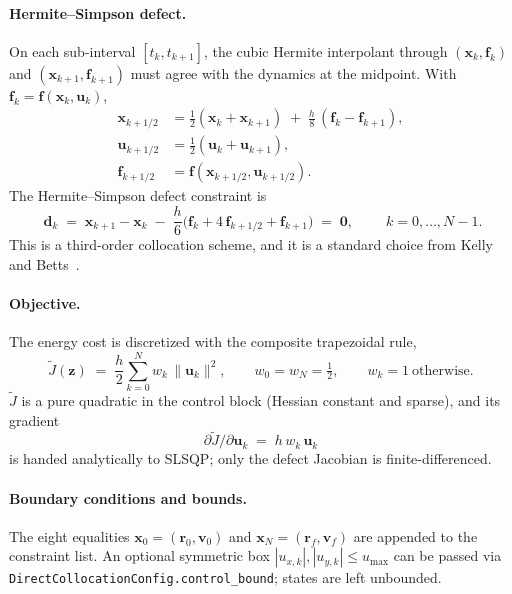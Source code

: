 \documentclass[8pt,a4paper]{article}
\newcommand{\bvec}[1]{\bm{#1}}
\newcommand{\xvec}{\bvec{x}}
\newcommand{\uvec}{\bvec{u}}
\newcommand{\fvec}{\bvec{f}}
\theoremstyle{definition}
\theoremstyle{remark}
\begin{document}
\paragraph{Hermite--Simpson defect.}
On each sub-interval $[t_k, t_{k+1}]$, the cubic Hermite interpolant
through $(\xvec_k, \fvec_k)$ and $(\xvec_{k+1}, \fvec_{k+1})$ must
agree with the dynamics at the midpoint. With
$\fvec_k = \fvec(\xvec_k, \uvec_k)$,
\begin{align}
  \xvec_{k+1/2} &= \tfrac12(\xvec_k + \xvec_{k+1})
     \;+\; \tfrac{h}{8}\,(\fvec_k - \fvec_{k+1}), \\
  \uvec_{k+1/2} &= \tfrac12(\uvec_k + \uvec_{k+1}), \\
  \fvec_{k+1/2} &= \fvec(\xvec_{k+1/2}, \uvec_{k+1/2}).
\end{align}
The Hermite--Simpson defect constraint is
\begin{equation}
  \boxed{\;
  \bvec{d}_k \;=\; \xvec_{k+1} - \xvec_k
     \;-\; \frac{h}{6}\big(\fvec_k + 4\,\fvec_{k+1/2} + \fvec_{k+1}\big)
     \;=\; \bm 0,
  \;}
  \qquad k = 0, \dots, N - 1.
\label{eq:hs-defect}
\end{equation}
This is a third-order collocation scheme, and it is a standard
choice from Kelly~\cite{Kelly2017} and Betts~\cite{Betts2010}.

\paragraph{Objective.}
The energy cost is discretized with the composite trapezoidal rule,
\begin{equation}
  \tilde J(\bvec z) \;=\; \frac{h}{2}\sum_{k=0}^{N} w_k\,\|\uvec_k\|^2,
  \qquad w_0 = w_N = \tfrac12,
  \qquad w_k = 1\ \text{otherwise}.
\end{equation}
$\tilde J$ is a pure quadratic in the control block (Hessian constant
and sparse), and its gradient
\[
  \partial \tilde J/\partial \uvec_k \;=\; h\,w_k\,\uvec_k
\]
is handed analytically to SLSQP; only the defect Jacobian is
finite-differenced.

\paragraph{Boundary conditions and bounds.}
The eight equalities
$\xvec_0 = (\bvec r_0, \bvec v_0)$ and
$\xvec_N = (\bvec r_f, \bvec v_f)$ are appended to the constraint
list. An optional symmetric box
$|u_{x,k}|, |u_{y,k}| \leq u_{\max}$ can be passed via
\texttt{DirectCollocationConfig.control\_bound}; states are left
unbounded.
\end{document}
